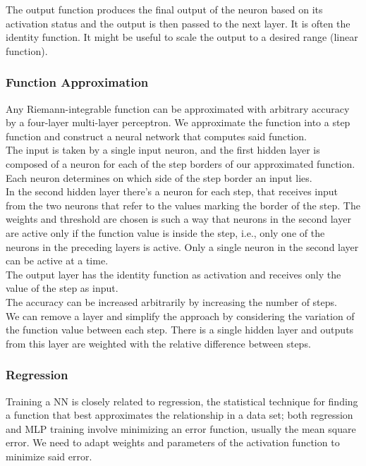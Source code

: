 The output function produces the final output of the neuron based on its activation status and the output is then passed to the next layer. It is often the identity function. It might be useful to scale the output to a desired range (linear function).\\

\subsubsection{Function Approximation}
Any Riemann-integrable function can be approximated with arbitrary accuracy by a four-layer multi-layer perceptron. We approximate the function into a step function and construct a neural network that computes said function.\\

The input is taken by a single input neuron, and the first hidden layer is composed of a neuron for each of the step borders of our approximated function. Each neuron determines on which side of the step border an input lies.\\
In the second hidden layer there's a neuron for each step, that receives input from the two neurons that refer to the values marking the border of the step. The weights and threshold are chosen is such a way that neurons in the second layer are active only if the function value is inside the step, i.e., only one of the neurons in the preceding layers is active. Only a single neuron in the second layer can be active at a time.\\
The output layer has the identity function as activation and receives only the value of the step as input.\\

The accuracy can be increased arbitrarily by increasing the number of steps.\\

We can remove a layer and simplify the approach by considering the variation of the function value between each step. There is a single hidden layer and outputs from this layer are weighted with the relative difference between steps.\\

\subsubsection{Regression}
Training a NN is closely related to regression, the statistical technique for finding a function that best approximates the relationship in a data set; both regression and MLP training involve minimizing an error function, usually the mean square error. We need to adapt weights and parameters of the activation function to minimize said error.\\

